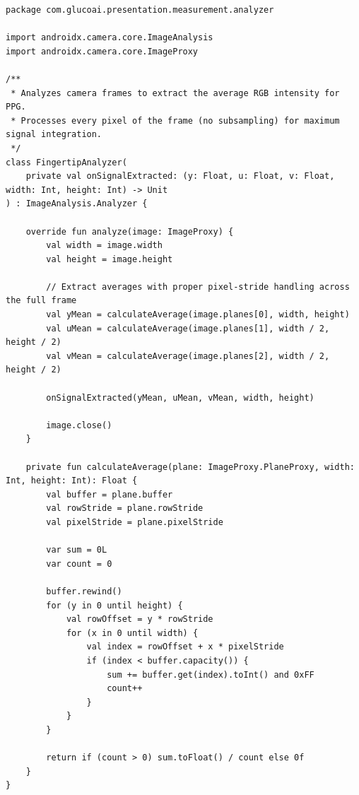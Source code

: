 \vspace{1.5em}
\begin{center}
    \begin{minipage}{\textwidth}
        \centering
        \label{lst:kotlin_analyzer}
        \vspace{-0.5em}
    \end{minipage}
\end{center}
\begin{verbatim}
package com.glucoai.presentation.measurement.analyzer

import androidx.camera.core.ImageAnalysis
import androidx.camera.core.ImageProxy

/**
 * Analyzes camera frames to extract the average RGB intensity for PPG.
 * Processes every pixel of the frame (no subsampling) for maximum signal integration.
 */
class FingertipAnalyzer(
    private val onSignalExtracted: (y: Float, u: Float, v: Float, width: Int, height: Int) -> Unit
) : ImageAnalysis.Analyzer {

    override fun analyze(image: ImageProxy) {
        val width = image.width
        val height = image.height
        
        // Extract averages with proper pixel-stride handling across the full frame
        val yMean = calculateAverage(image.planes[0], width, height)
        val uMean = calculateAverage(image.planes[1], width / 2, height / 2)
        val vMean = calculateAverage(image.planes[2], width / 2, height / 2)

        onSignalExtracted(yMean, uMean, vMean, width, height)

        image.close()
    }

    private fun calculateAverage(plane: ImageProxy.PlaneProxy, width: Int, height: Int): Float {
        val buffer = plane.buffer
        val rowStride = plane.rowStride
        val pixelStride = plane.pixelStride
        
        var sum = 0L
        var count = 0
        
        buffer.rewind()
        for (y in 0 until height) {
            val rowOffset = y * rowStride
            for (x in 0 until width) {
                val index = rowOffset + x * pixelStride
                if (index < buffer.capacity()) {
                    sum += buffer.get(index).toInt() and 0xFF
                    count++
                }
            }
        }
        
        return if (count > 0) sum.toFloat() / count else 0f
    }
}
\end{verbatim}
\vspace{1.5em}

